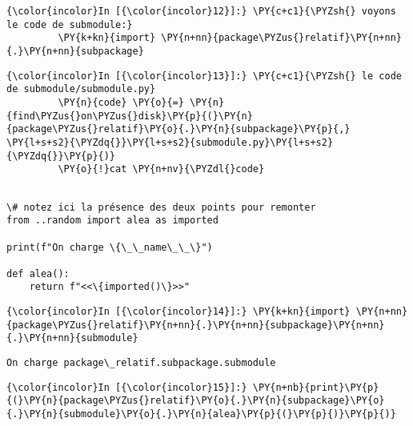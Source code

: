     \begin{Verbatim}[commandchars=\\\{\}]
{\color{incolor}In [{\color{incolor}12}]:} \PY{c+c1}{\PYZsh{} voyons le code de submodule:}
         \PY{k+kn}{import} \PY{n+nn}{package\PYZus{}relatif}\PY{n+nn}{.}\PY{n+nn}{subpackage}
\end{Verbatim}


    \begin{Verbatim}[commandchars=\\\{\}]
{\color{incolor}In [{\color{incolor}13}]:} \PY{c+c1}{\PYZsh{} le code de submodule/submodule.py}
         \PY{n}{code} \PY{o}{=} \PY{n}{find\PYZus{}on\PYZus{}disk}\PY{p}{(}\PY{n}{package\PYZus{}relatif}\PY{o}{.}\PY{n}{subpackage}\PY{p}{,} \PY{l+s+s2}{\PYZdq{}}\PY{l+s+s2}{submodule.py}\PY{l+s+s2}{\PYZdq{}}\PY{p}{)}
         \PY{o}{!}cat \PY{n+nv}{\PYZdl{}code}
\end{Verbatim}


    \begin{Verbatim}[commandchars=\\\{\}]

\# notez ici la présence des deux points pour remonter
from ..random import alea as imported

print(f"On charge \{\_\_name\_\_\}")

def alea():
    return f"<<\{imported()\}>>"

    \end{Verbatim}

    \begin{Verbatim}[commandchars=\\\{\}]
{\color{incolor}In [{\color{incolor}14}]:} \PY{k+kn}{import} \PY{n+nn}{package\PYZus{}relatif}\PY{n+nn}{.}\PY{n+nn}{subpackage}\PY{n+nn}{.}\PY{n+nn}{submodule}
\end{Verbatim}


    \begin{Verbatim}[commandchars=\\\{\}]
On charge package\_relatif.subpackage.submodule

    \end{Verbatim}

    \begin{Verbatim}[commandchars=\\\{\}]
{\color{incolor}In [{\color{incolor}15}]:} \PY{n+nb}{print}\PY{p}{(}\PY{n}{package\PYZus{}relatif}\PY{o}{.}\PY{n}{subpackage}\PY{o}{.}\PY{n}{submodule}\PY{o}{.}\PY{n}{alea}\PY{p}{(}\PY{p}{)}\PY{p}{)}
\end{Verbatim}


